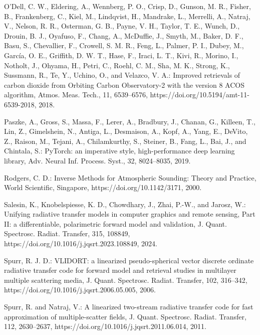\documentclass[gmd, manuscript]{copernicus}
\begin{document}
\begin{thebibliography}{}
O'Dell, C. W., Eldering, A., Wennberg, P. O., Crisp, D., Gunson, M. R.,
Fisher, B., Frankenberg, C., Kiel, M., Lindqvist, H., Mandrake, L.,
Merrelli, A., Natraj, V., Nelson, R. R., Osterman, G. B., Payne, V. H.,
Taylor, T. E., Wunch, D., Drouin, B. J., Oyafuso, F., Chang, A.,
McDuffie, J., Smyth, M., Baker, D. F., Basu, S., Chevallier, F.,
Crowell, S. M. R., Feng, L., Palmer, P. I., Dubey, M., García, O. E.,
Griffith, D. W. T., Hase, F., Iraci, L. T., Kivi, R., Morino, I.,
Notholt, J., Ohyama, H., Petri, C., Roehl, C. M., Sha, M. K., Strong, K.,
Sussmann, R., Te, Y., Uchino, O., and Velazco, V. A.: Improved retrievals of
carbon dioxide from Orbiting Carbon Observatory-2 with the version 8 ACOS
algorithm, Atmos. Meas. Tech., 11, 6539--6576,
https://doi.org/10.5194/amt-11-6539-2018, 2018.

Paszke, A., Gross, S., Massa, F., Lerer, A., Bradbury, J., Chanan, G.,
Killeen, T., Lin, Z., Gimelshein, N., Antiga, L., Desmaison, A.,
Kopf, A., Yang, E., DeVito, Z., Raison, M., Tejani, A., Chilamkurthy,
S., Steiner, B., Fang, L., Bai, J., and Chintala, S.: PyTorch: an imperative
style, high-performance deep learning library, Adv. Neural Inf. Process. Syst.,
32, 8024--8035, 2019.

Rodgers, C. D.: Inverse Methods for Atmospheric Sounding: Theory and Practice,
World Scientific, Singapore, https://doi.org/10.1142/3171, 2000.

Salesin, K., Knobelspiesse, K. D., Chowdhary, J., Zhai, P.-W., and Jarosz, W.:
Unifying radiative transfer models in computer graphics and remote sensing, Part
II: a differentiable, polarimetric forward model and validation, J. Quant.
Spectrosc. Radiat. Transfer, 315, 108849,
https://doi.org/10.1016/j.jqsrt.2023.108849,
2024.

Spurr, R. J. D.: VLIDORT: a linearized pseudo-spherical vector discrete ordinate
radiative transfer code for forward model and retrieval studies in multilayer
multiple scattering media, J. Quant. Spectrosc. Radiat. Transfer, 102, 316--342,
https://doi.org/10.1016/j.jqsrt.2006.05.005, 2006.

Spurr, R. and Natraj, V.: A linearized two-stream radiative transfer code for
fast approximation of multiple-scatter fields, J. Quant. Spectrosc. Radiat.
Transfer, 112, 2630--2637, https://doi.org/10.1016/j.jqsrt.2011.06.014, 2011.


\end{thebibliography}
\end{document}
